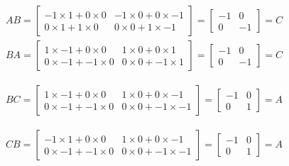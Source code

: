\documentclass[11pt,oneside]{article}
\numberwithin{equation}{section}
\theoremstyle{definition}
\begin{document}
\begin{solution}
\begin{align*}
  A B = \begin{bmatrix}
    -1 \times 1 + 0 \times 0 & -1 \times 0 + 0 \times -1 \\
    0 \times 1 + 1 \times 0 & 0 \times 0 + 1 \times -1
  \end{bmatrix}
  = \begin{bmatrix}
    -1 & 0 \\
    0 & -1
    \end{bmatrix} = C
\end{align*}
\begin{align*}
  B A = \begin{bmatrix}
    1 \times -1 + 0 \times 0 & 1 \times 0 + 0 \times 1 \\
    0 \times -1 + -1 \times 0 & 0 \times 0 + -1 \times 1
  \end{bmatrix}
  = \begin{bmatrix}
    -1 & 0 \\
    0 & -1
    \end{bmatrix} = C
\end{align*}

\begin{align*}
  B C = \begin{bmatrix}
    1 \times -1 + 0 \times 0 & 1 \times 0 + 0 \times -1 \\
    0 \times -1 + -1 \times 0 & 0 \times 0 + -1 \times -1
  \end{bmatrix}
  = \begin{bmatrix}
    -1 & 0 \\
    0 & 1
    \end{bmatrix} = A
\end{align*}

\begin{align*}
  C B = \begin{bmatrix}
    -1 \times 1 + 0 \times 0 & 1 \times 0 + 0 \times -1 \\
    0 \times -1 + -1 \times 0 & 0 \times 0 + -1 \times -1
  \end{bmatrix}
  = \begin{bmatrix}
    -1 & 0 \\
    0 & 1
    \end{bmatrix} = A
\end{align*}


\end{solution}
\end{document}
